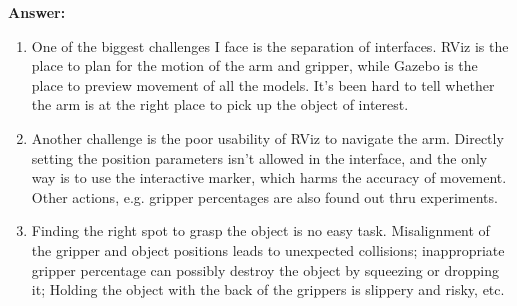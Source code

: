 \documentclass[12pt]{article}
\begin{document}
\begin{enumerate}
    \textbf{Answer: }
    \begin{enumerate}
        \item One of the biggest challenges I face is the separation of interfaces. RViz is the place to plan for the motion of the arm and gripper, while Gazebo is the place to preview movement of all the models. It's been hard to tell whether the arm is at the right place to pick up the object of interest.
        \item Another challenge is the poor usability of RViz to navigate the arm. Directly setting the position parameters isn't allowed in the interface, and the only way is to use the interactive marker, which harms the accuracy of movement. Other actions, e.g. gripper percentages are also found out thru experiments.
        \item Finding the right spot to grasp the object is no easy task. Misalignment of the gripper and object positions leads to unexpected collisions; inappropriate gripper percentage can possibly destroy the object by squeezing or dropping it; Holding the object with the back of the grippers is slippery and risky, etc.
    \end{enumerate}

\end{enumerate}
\end{document}
